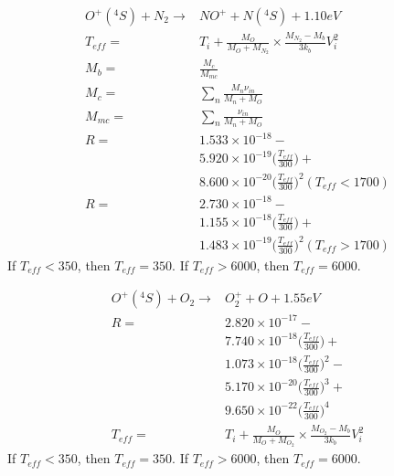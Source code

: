 \documentclass[twoside,10pt]{book}
\begin{document}
\begin{equation}
\begin{split}
O^+(^4S) + N_2 \rightarrow &  NO^+ + N(^4S) + 1.10 eV\\
T_{eff} = & T_i + \frac{M_O}{M_O + M_{N_2}}\times\frac{M_{N_2} - M_b}{3k_b}V_i^2 \\
M_b = &\frac{M_c}{M_{mc}} \\
M_c = & \sum_n \frac{M_n\nu_{in}}{M_n + M_O} \\
M_{mc} = & \sum_n \frac{   \nu_{in}}{M_n + M_O} \\
R = & 1.533\times 10^{-18} - \\
    & 5.920\times 10^{-19} \bigg(\frac{T_{eff}}{300}\bigg) + \\
    & 8.600\times 10^{-20} \bigg(\frac{T_{eff}}{300}\bigg)^2 (T_{eff} < 1700) \\
R = & 2.730\times 10^{-18} - \\
    & 1.155\times 10^{-18} \bigg(\frac{T_{eff}}{300}\bigg) + \\
    & 1.483\times 10^{-19} \bigg(\frac{T_{eff}}{300}\bigg)^2 (T_{eff} > 1700)
\end{split}
\end{equation}
If $T_{eff} < 350$, then $T_{eff} = 350$.
If $T_{eff} > 6000$, then $T_{eff} = 6000$.

\begin{equation}
\begin{split}
O^+(^4S) + O_2 \rightarrow &  O_2^+ + O + 1.55 eV\\
R = & 2.820\times 10^{-17} - \\
    & 7.740\times 10^{-18} \bigg(\frac{T_{eff}}{300}\bigg) + \\
    & 1.073\times 10^{-18} \bigg(\frac{T_{eff}}{300}\bigg)^2 - \\ 
    & 5.170\times 10^{-20} \bigg(\frac{T_{eff}}{300}\bigg)^3 + \\ 
    & 9.650\times 10^{-22} \bigg(\frac{T_{eff}}{300}\bigg)^4\\
T_{eff} = & T_i + \frac{M_O}{M_O + M_{O_2}}\times\frac{M_{O_2} - M_b}{3k_b}V_i^2
\end{split}
\end{equation}
If $T_{eff} < 350$, then $T_{eff} = 350$.
If $T_{eff} > 6000$, then $T_{eff} = 6000$.
\end{document}
